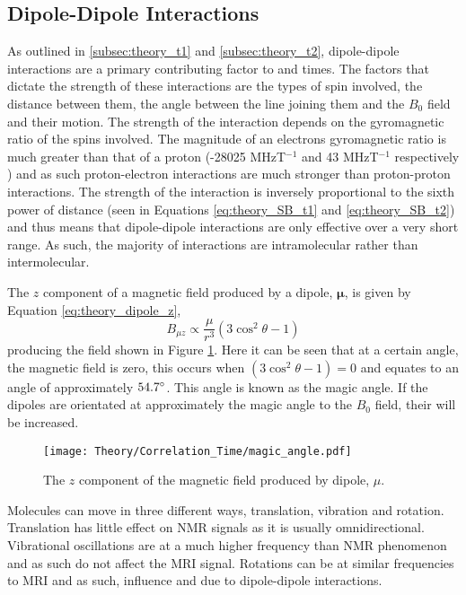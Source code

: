 \subsection{Dipole-Dipole Interactions}
\label{subsec:theory_dipole_dipole_interactions}
As outlined in \ref{subsec:theory_t1} and \ref{subsec:theory_t2}, dipole-dipole interactions are a primary contributing factor to \tone and \ttwo times. The factors that dictate the strength of these interactions are the types of spin involved, the distance between them, the angle between the line joining them and the $B_0$ field and their motion. The strength of the interaction depends on the gyromagnetic ratio of the spins involved. The magnitude of an electrons gyromagnetic ratio is much greater than that of a proton (-28025 MHzT$^{-1}$ and 43 MHzT$^{-1}$ respectively \cite{mohr_codata_2016}) and as such proton-electron interactions are much stronger than proton-proton interactions. The strength of the interaction is inversely proportional to the sixth power of distance (seen in Equations \eqref{eq:theory_SB_t1} and \eqref{eq:theory_SB_t2}) and thus means that dipole-dipole interactions are only effective over a very short range. As such, the majority of interactions are intramolecular rather than intermolecular.

The $z$ component of a magnetic field produced by a dipole, $\bm{\mu}$, is given by Equation \ref{eq:theory_dipole_z},
\begin{equation}
	B_{\mu z} \propto \frac{\mu}{r^3}\left( 3\cos^2\theta -1\right) 
	\label{eq:theory_dipole_z}
\end{equation}
producing the field shown in Figure \ref{fig:theory_magic_angle}. Here it can be seen that at a certain angle, the magnetic field is zero, this occurs when $\left( 3\cos^2\theta -1\right) = 0$ and equates to an angle of approximately $54.7\degree$. This angle is known as the magic angle. If the dipoles are orientated at approximately the magic angle to the $B_0$ field, their \ttwo will be increased.


\begin{figure}[H]
	\centering
	\texttt{[image: Theory/Correlation\_Time/magic\_angle.pdf]}
	\caption{The $z$ component of the magnetic field produced by dipole, $\mu$.}
	\label{fig:theory_magic_angle}	
\end{figure}

Molecules can move in three different ways, translation, vibration and rotation. Translation has little effect on \ac{NMR} signals as it is usually omnidirectional. Vibrational oscillations are at a much higher frequency than \ac{NMR} phenomenon and as such do not affect the \ac{MRI} signal. Rotations can be at similar frequencies to \ac{MRI} and as such, influence \tone and \ttwo due to dipole-dipole interactions.

